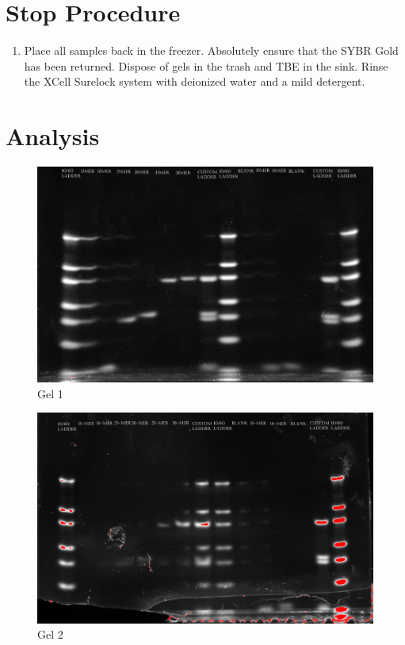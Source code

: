 \documentclass[letterpaper]{article}
\begin{document}
\section{Stop Procedure}
\begin{enumerate}
\item{Place all samples back in the freezer. Absolutely ensure that the SYBR Gold has been returned. Dispose of gels in the trash and TBE in the sink. Rinse the XCell Surelock system with deionized water and a mild detergent.}
\end{enumerate}

%
\section{Analysis}
\begin{figure}[ht]
\begin{center}
\includegraphics[width=.8\textwidth]{Alan_Ladder.png}
\caption{Gel 1}
\label{gels1}
\end{center}
\end{figure}
\begin{figure}[ht]
\begin{center}
\includegraphics[width=.8\textwidth]{JacklynRyan_Gel.png}
\caption{Gel 2}
\end{center}
\end{figure}
\end{document}
